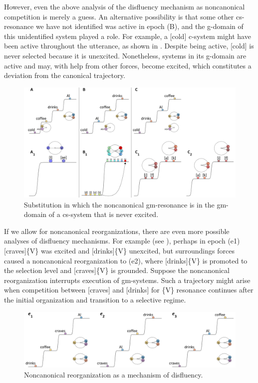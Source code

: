   However, even the above analysis of the disfluency mechanism as noncanonical competition is merely a guess. An alternative possibility is that some other cs-resonance we have not identified was active in epoch (B), and the g-domain of this unidentified system played a role. For example, a [cold] c-system might have been active throughout the utterance, as shown in {}. Despite being active, [cold] is never selected because it is unexcited. Nonetheless, systems in its g-domain are active and may, with help from other forces, become excited, which constitutes a deviation from the canonical trajectory.

  
\begin{figure}
\includegraphics[width=\textwidth]{figures/Tilsen-img59.png}
\caption{Substitution in which the noncanonical gm-resonance is in the gm-domain of a cs-system that is never excited.}
\label{fig:4:8b}
\end{figure}
 

  If we allow for noncanonical reorganizations, there are even more possible analyses of disfluency mechanisms. For example (see {}), perhaps in epoch (e1) [craves]\{V\} was excited and [drinks]\{V\} unexcited, but surroundings forces caused a noncanonical reorganization to (e2), where [drinks]\{V\} is promoted to the selection level and [craves]\{V\} is grounded. Suppose the noncanonical reorganization interrupts execution of gm-systems. Such a trajectory might arise when competition between [craves] and [drinks] for \{V\} resonance continues after the initial organization and transition to a selective regime. 

  
\begin{figure}
\includegraphics[width=\textwidth]{figures/Tilsen-img60.png}
\caption{Noncanonical reorganization as a mechanism of disfluency.}
\label{fig:4:10}
\end{figure}
 

